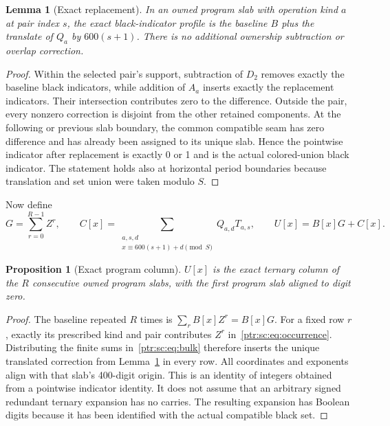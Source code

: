 \documentclass[11pt,letterpaper]{article}
\newtheorem{lemma}[theorem]{Lemma}
\newtheorem{proposition}[theorem]{Proposition}
\theoremstyle{definition}\newtheorem{definition}[theorem]{Definition}
\theoremstyle{remark}\newtheorem{remark}[theorem]{Remark}
\begin{document}
\begin{lemma}[Exact replacement]\label{ptr:sc:lem:replacement}
In an owned program slab with operation kind $a$ at pair index $s$, the exact black-indicator profile is the baseline $B$ plus the translate of $Q_a$ by $600(s+1)$. There is no additional ownership subtraction or overlap correction.
\end{lemma}
\begin{proof}
Within the selected pair's support, subtraction of $D_2$ removes exactly the baseline black indicators, while addition of $A_a$ inserts exactly the replacement indicators. Their intersection contributes zero to the difference. Outside the pair, every nonzero correction is disjoint from the other retained components. At the following or previous slab boundary, the common compatible seam has zero difference and has already been assigned to its unique slab. Hence the pointwise indicator after replacement is exactly 0 or 1 and is the actual colored-union black indicator. The statement holds also at horizontal period boundaries because translation and set union were taken modulo $S$.
\end{proof}
Now define
\begin{equation}\label{ptr:sc:eq:bulk}
 G=\sum_{r=0}^{R-1}Z^r,\qquad
 C[x]=\sum_{\substack{a,s,d\\x\equiv600(s+1)+d\pmod S}}Q_{a,d}T_{a,s},
 \qquad U[x]=B[x]G+C[x].
\end{equation}
\begin{proposition}[Exact program column]\label{ptr:sc:prop:bulk}
$U[x]$ is the exact ternary column of the $R$ consecutive owned program slabs, with the first program slab aligned to digit zero.
\end{proposition}
\begin{proof}
The baseline repeated $R$ times is $\sum_r B[x]Z^r=B[x]G$. For a fixed row $r$, exactly its prescribed kind and pair contributes $Z^r$ in~\eqref{ptr:sc:eq:occurrence}. Distributing the finite sums in~\eqref{ptr:sc:eq:bulk} therefore inserts the unique translated correction from Lemma~\ref{ptr:sc:lem:replacement} in every row. All coordinates and exponents align with that slab's 400-digit origin. This is an identity of integers obtained from a pointwise indicator identity. It does not assume that an arbitrary signed redundant ternary expansion has no carries. The resulting expansion has Boolean digits because it has been identified with the actual compatible black set.
\end{proof}
\end{document}
